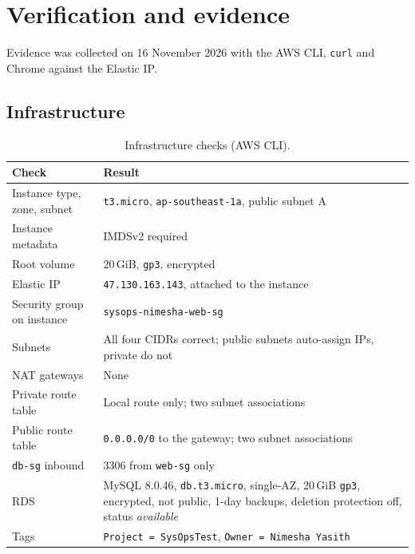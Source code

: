 \documentclass[11pt,a4paper]{article}
\newcommand{\code}[1]{\texttt{#1}}
\begin{document}
\section{Verification and evidence}
Evidence was collected on 16 November 2026 with the AWS CLI, \code{curl} and Chrome against
the Elastic IP.

\subsection{Infrastructure}
\begin{table}[H]
\centering
\begin{tabular}{@{}p{5.4cm}p{9.2cm}@{}}
\toprule
\textbf{Check} & \textbf{Result}\\
\midrule
Instance type, zone, subnet & \code{t3.micro}, \code{ap-southeast-1a}, public subnet A\\
Instance metadata & IMDSv2 required\\
Root volume & 20\,GiB, \code{gp3}, encrypted\\
Elastic IP & \code{47.130.163.143}, attached to the instance\\
Security group on instance & \code{sysops-nimesha-web-sg}\\
Subnets & All four CIDRs correct; public subnets auto-assign IPs, private do not\\
NAT gateways & None\\
Private route table & Local route only; two subnet associations\\
Public route table & \code{0.0.0.0/0} to the gateway; two subnet associations\\
\code{db-sg} inbound & 3306 from \code{web-sg} only\\
RDS & MySQL 8.0.46, \code{db.t3.micro}, single-AZ, 20\,GiB \code{gp3}, encrypted, not public, 1-day backups, deletion protection off, status \emph{available}\\
Tags & \code{Project = SysOpsTest}, \code{Owner = Nimesha Yasith}\\
\bottomrule
\end{tabular}
\caption{Infrastructure checks (AWS CLI).}
\end{table}
\end{document}
